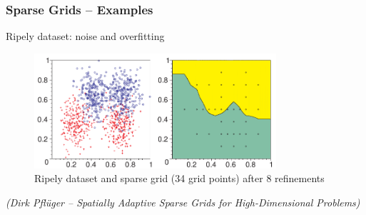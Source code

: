 \begin{frame}
  \frametitle{Sparse Grids -- Examples}
  \topline
  \vspace{-10px}
  \begin{block}{Ripely dataset: noise and overfitting}
    \begin{figure}[!htp]
      \hspace{10px}
      \includegraphics[width=0.8\textwidth]{images/example_ripely}
      \centering
      \vspace{-2px}
      \caption{Ripely dataset and sparse grid (34 grid points) after 8
      refinements}
    \end{figure}
    \begin{flushright}
      \tiny{\emph{(Dirk Pflüger -- Spatially Adaptive Sparse Grids for
          High-Dimensional Problems)}}
    \end{flushright}
  \end{block}
\end{frame}

